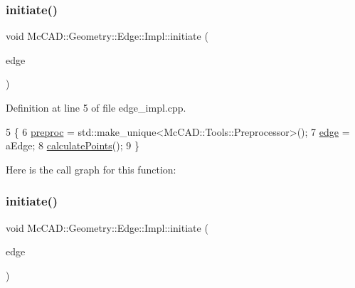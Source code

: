 \mbox{\label{classMcCAD_1_1Geometry_1_1Edge_1_1Impl_a73c526d6129fcf6a5644cc9e25e13809}} 
\subsubsection{\texorpdfstring{initiate()}{initiate()}\hspace{0.1cm}{\footnotesize\ttfamily [1/2]}}
{\footnotesize\ttfamily void Mc\+C\+A\+D\+::\+Geometry\+::\+Edge\+::\+Impl\+::initiate (\begin{DoxyParamCaption}\item[{const Topo\+D\+S\+\_\+\+Edge \&}]{edge }\end{DoxyParamCaption})}



Definition at line 5 of file edge\+\_\+impl.\+cpp.


\begin{DoxyCode}
5                                                        \{
6   \hyperlink{classMcCAD_1_1Geometry_1_1Edge_1_1Impl_a4921c9d696c5edbfe28ca3ff12d96145}{preproc} = std::make\_unique<McCAD::Tools::Preprocessor>();
7   \hyperlink{classMcCAD_1_1Geometry_1_1Edge_1_1Impl_af6c62d8c4fb496f202ea8029a1304f5c}{edge} = aEdge;
8   \hyperlink{classMcCAD_1_1Geometry_1_1Edge_1_1Impl_a6541fcc122721729d3f0f3001be3a8fa}{calculatePoints}();
9 \}
\end{DoxyCode}
Here is the call graph for this function\+:
\mbox{\label{classMcCAD_1_1Geometry_1_1Edge_1_1Impl_a73c526d6129fcf6a5644cc9e25e13809}} 
\subsubsection{\texorpdfstring{initiate()}{initiate()}\hspace{0.1cm}{\footnotesize\ttfamily [2/2]}}
{\footnotesize\ttfamily void Mc\+C\+A\+D\+::\+Geometry\+::\+Edge\+::\+Impl\+::initiate (\begin{DoxyParamCaption}\item[{const Topo\+D\+S\+\_\+\+Edge \&}]{edge }\end{DoxyParamCaption})}

